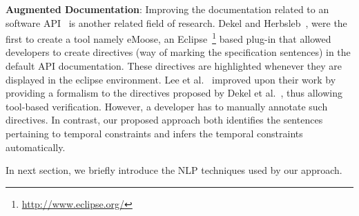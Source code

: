 \textbf{Augmented Documentation}:
Improving the documentation related to an software API~\cite{Dekel2009,tan2011acomment} is another related field of research.
Dekel and Herbsleb~\cite{Dekel2009}, were the first to create a tool namely eMoose,
an Eclipse~\footnote{\url{http://www.eclipse.org/}} based plug-in that allowed developers to create directives
(way of marking the specification sentences) in the default API documentation.
These directives are highlighted whenever they are displayed in the eclipse environment.
Lee et al.~\cite{lee2012towards} improved upon their work by providing a formalism to the directives proposed by Dekel et al.~\cite{Dekel2009},
thus allowing tool-based verification.
However, a developer has to manually annotate such directives.
In contrast, our proposed approach both identifies the sentences pertaining to temporal constraints and infers the temporal constraints automatically. 

In next section, we briefly introduce the NLP techniques used by our approach.